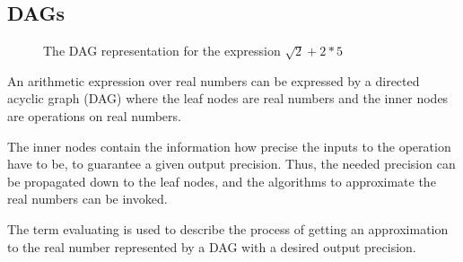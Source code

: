 	\subsection{DAGs}
  \begin{figure}[h]
      \centering
\caption{The DAG representation for the expression $\sqrt 2 + 2*5$}
    \end{figure}
		An arithmetic expression over real numbers can be expressed by a directed acyclic graph (DAG)
		where the leaf nodes are real numbers and the inner nodes are operations on real numbers.
		
    The inner nodes contain the information how precise the inputs to the
    operation have to be, to guarantee a given output precision.
    Thus, the needed precision can be propagated down to the leaf nodes, and
    the algorithms to approximate the real numbers can be invoked.

	  The term evaluating is used to describe the process of getting an approximation
    to the real number represented by a DAG with a desired output  precision.

